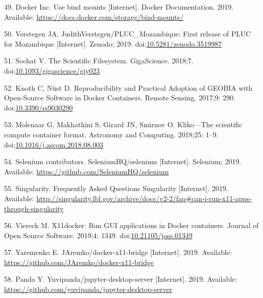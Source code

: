 \documentclass[10pt,letterpaper]{article}
\begin{document}
\leavevmode\hypertarget{ref-docker_use_2019}{}%
49. Docker Inc. Use bind mounts {[}Internet{]}. Docker Documentation.
2019. Available: \url{https://docs.docker.com/storage/bind-mounts/}

\leavevmode\hypertarget{ref-verstegen_pluc_mozambique_2019}{}%
50. Verstegen JA. JudithVerstegen/PLUC\_Mozambique: First release of
PLUC for Mozambique {[}Internet{]}. Zenodo; 2019.
doi:\href{https://doi.org/10.5281/zenodo.3519987}{10.5281/zenodo.3519987}

\leavevmode\hypertarget{ref-sochat_scientific_2018}{}%
51. Sochat V. The Scientific Filesystem. GigaScience. 2018;7.
doi:\href{https://doi.org/10.1093/gigascience/giy023}{10.1093/gigascience/giy023}

\leavevmode\hypertarget{ref-knoth_reproducibility_2017}{}%
52. Knoth C, Nüst D. Reproducibility and Practical Adoption of GEOBIA
with Open-Source Software in Docker Containers. Remote Sensing. 2017;9:
290. doi:\href{https://doi.org/10.3390/rs9030290}{10.3390/rs9030290}

\leavevmode\hypertarget{ref-molenaar_klikoscientific_2018}{}%
53. Molenaar G, Makhathini S, Girard JN, Smirnov O. Kliko---The
scientific compute container format. Astronomy and Computing. 2018;25:
1--9.
doi:\href{https://doi.org/10.1016/j.ascom.2018.08.003}{10.1016/j.ascom.2018.08.003}

\leavevmode\hypertarget{ref-selenium_2019}{}%
54. Selenium contributors. SeleniumHQ/selenium {[}Internet{]}. Selenium;
2019. Available: \url{https://github.com/SeleniumHQ/selenium}

\leavevmode\hypertarget{ref-singularity_frequently_2019}{}%
55. Singularity. Frequently Asked Questions Singularity {[}Internet{]}.
2019. Available:
\url{http://singularity.lbl.gov/archive/docs/v2-2/faq\#can-i-run-x11-apps-through-singularity}

\leavevmode\hypertarget{ref-viereck_x11docker_2019}{}%
56. Viereck M. X11docker: Run GUI applications in Docker containers.
Journal of Open Source Software. 2019;4: 1349.
doi:\href{https://doi.org/10.21105/joss.01349}{10.21105/joss.01349}

\leavevmode\hypertarget{ref-yaremenko_docker-x11-bridge_2019}{}%
57. Yaremenko E. JAremko/docker-x11-bridge {[}Internet{]}. 2019.
Available: \url{https://github.com/JAremko/docker-x11-bridge}

\leavevmode\hypertarget{ref-yuvipanda_jupyter-desktop-server_2019}{}%
58. Panda Y. Yuvipanda/jupyter-desktop-server {[}Internet{]}. 2019.
Available: \url{https://github.com/yuvipanda/jupyter-desktop-server}
\end{document}
